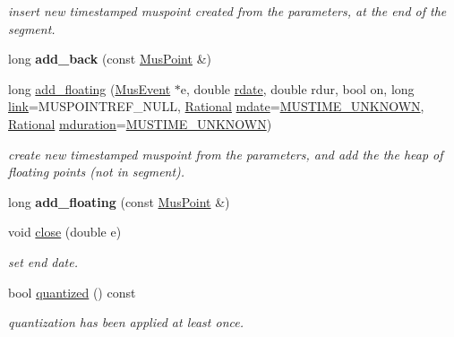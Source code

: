 \begin{DoxyCompactItemize}
\begin{DoxyCompactList}\small\item\em insert new timestamped muspoint created from the parameters, at the end of the segment. \end{DoxyCompactList}\item 
long {\bfseries add\+\_\+back} (const \mbox{\hyperlink{classMusPoint}{Mus\+Point}} \&)
\item 
long \mbox{\hyperlink{group__segment_gad44eb7379e181fc4295ee2514a568204}{add\+\_\+floating}} (\mbox{\hyperlink{classMusEvent}{Mus\+Event}} $\ast$e, double \mbox{\hyperlink{group__segment_ga7c26187b3e70ea62bd10b9b15284a99a}{rdate}}, double rdur, bool on, long \mbox{\hyperlink{group__segment_ga43310a16681e2241b20da4b68de9f35b}{link}}=M\+U\+S\+P\+O\+I\+N\+T\+R\+E\+F\+\_\+\+N\+U\+LL, \mbox{\hyperlink{classRational}{Rational}} \mbox{\hyperlink{group__segment_ga6fce03f54fe517cc9541ea446cd26a50}{mdate}}=\mbox{\hyperlink{group__general_gae862a9d955eb3154601efb64980ac24b}{M\+U\+S\+T\+I\+M\+E\+\_\+\+U\+N\+K\+N\+O\+WN}}, \mbox{\hyperlink{classRational}{Rational}} \mbox{\hyperlink{classInputSegment_aa5410aeef3d5c6a263424b252eb78511}{mduration}}=\mbox{\hyperlink{group__general_gae862a9d955eb3154601efb64980ac24b}{M\+U\+S\+T\+I\+M\+E\+\_\+\+U\+N\+K\+N\+O\+WN}})
\begin{DoxyCompactList}\small\item\em create new timestamped muspoint from the parameters, and add the the heap of floating points (not in segment). \end{DoxyCompactList}\item 
long {\bfseries add\+\_\+floating} (const \mbox{\hyperlink{classMusPoint}{Mus\+Point}} \&)
\item 
void \mbox{\hyperlink{group__segment_gae75db088893a7cfc719ec393e09d7ece}{close}} (double e)
\begin{DoxyCompactList}\small\item\em set end date. \end{DoxyCompactList}\item 
\mbox{\label{classInputSegment_a2aa5d8948f3ac162a770bc84bb23ca2f}} 
bool \mbox{\hyperlink{classInputSegment_a2aa5d8948f3ac162a770bc84bb23ca2f}{quantized}} () const
\begin{DoxyCompactList}\small\item\em quantization has been applied at least once. \end{DoxyCompactList}\item 

\end{DoxyCompactItemize}
